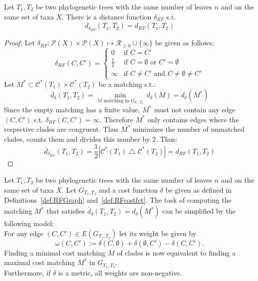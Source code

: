\begin{lem}
Let $T_1, T_2$ be two phylogenetic trees with the same number of leaves $n$ and on the same set of taxa $X$. There is a distance function $\delta_{RF}$ s.t. 
$$\overline{d}_{\delta_{RF}}(T_1,T_2) = d_{RF}(T_1,T_2)$$ 
\end{lem}
\begin{proof}
Let $\delta_{RF}: \mathcal{P}(X) \times \mathcal{P}(X) \mapsto \mathcal{R}_{\geq 0} \cup \{\infty\}$ be given as follows:
$$\delta_{RF}(C, C') = 
\begin{cases}
	0 & \text{if } C = C' \\
	\frac{1}{2} & \text{if } C = \emptyset \text{ or } C' = \emptyset \\
	\infty & \text{if } C \neq C' \text{ and } C \neq \emptyset \neq C'
\end{cases}$$
Let $M^* \subset \mathcal{C}^*(T_1) \times \mathcal{C}^*(T_2)$ be a matching s.t.:
$$\overline{d}_{\delta}(T_1,T_2) = \min_{M \text{ matching in }G_{T_1,T_2}} \, d_{\delta}(M) = d_{\delta}(M^*)$$
Since the empty matching has a finite value, $M^*$ must not contain any edge $(C, C')$ s.t. $\delta_{RF}(C, C') = \infty$. Therefore $M^*$ only contains edges where the respective clades are congruent. Thus $M^*$ minimizes the number of unmatched clades, counts them and divides this number by $2$. Thus:
$$\overline{d}_{\delta_{RF}}(T_1,T_2) =  \frac{1}{2}|\mathcal{C}^*(T_1) \bigtriangleup \mathcal{C}^*(T_2)|  = d_{RF}(T_1,T_2)$$ 
\end{proof}
\begin{lem}\label{lem:costfct}
Let $T_1, T_2$ be two phylogenetic trees with the same number of leaves $n$ and on the same set of taxa $X$. Let $G_{T_1,T_2}$ and a cost function $\delta$ be given as defined in Definitions~\ref{def:RFGraph} and~\ref{def:RFcostfct}. The task of computing the matching $M^*$ that satisfies $\overline{d}_{\delta}(T_1,T_2) = d_{\delta}(M^*)$ can be simplified by the following model:\\
For any edge $(C, C') \in E(G_{T_1,T_2})$ let its weight be given by
\begin{equation} \label{eq:costfct}
\omega(C,C') := \delta(C,\emptyset) + \delta(\emptyset, C') - \delta(C,C').
\end{equation}
Finding a minimal cost matching $M$ of clades is now equivalent to finding a maximal cost matching $M^*$ in $G_{T_1, T_2}$. \\
Furthermore, if $\delta$ is a metric, all weights are non-negative.
\end{lem}
